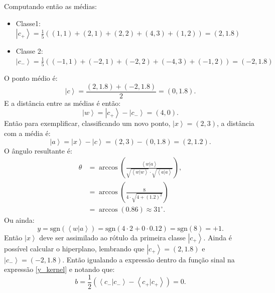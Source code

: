  Computando então as médias:
 \begin{itemize} 
 \item   Classe1: $\left|c_{+}\right\rangle =\frac{1}{5}\left(\left(1,1\right)+\left(2,1\right)+\left(2,2\right)+\left(4,3\right)+\left(1,2\right)\right)=\left(2,1.8\right)$
    \item Classe 2: $\left|c_{-}\right\rangle =\frac{1}{5}\left(\left(-1,1\right)+\left(-2,1\right)+\left(-2,2\right)+\left(-4,3\right)+\left(-1,2\right)\right)=\left(-2,1.8\right)$
 \end{itemize}
O ponto médio é: 
\begin{equation}
\left|c\right\rangle =\frac{\left(2,1.8\right)+\left(-2,1.8\right)}{2}=\left(0,1.8\right) .
\end{equation}
E a distância entre as médias é então:
\begin{equation}
\left|w\right\rangle =\left|c_{+}\right\rangle -\left|c_{-}\right\rangle =\left(4,0\right) .
\end{equation}
Então para exemplificar, classificando um novo ponto,  $\left|x\right\rangle =\left(2,3\right)$, a distância com a média é:
\begin{equation}
\left|a\right\rangle =\left|x\right\rangle -\left|c\right\rangle =\left(2,3\right)-\left(0,1.8\right)=\left(2,1.2\right) .
\end{equation}
O ângulo resultante é:
\begin{equation}
\begin{split}
\theta & =\arccos\left(\frac{\left\langle w|a\right\rangle }{\sqrt{\left\langle w|w\right\rangle }\cdot\sqrt{\left\langle a|a\right\rangle }}\right),\\
& = \arccos\left(\frac{8}{4\cdot\sqrt{4+\left(1.2\right)^{2}}}\right)\\
& =\arccos\left(0.86\right)\approx 31^{\circ} .
\end{split}
\end{equation}
Ou ainda:
\begin{equation}
y=\text{sgn}\left(\left\langle w|a\right\rangle \right)=\text{sgn}\left(4\cdot2+0\cdot0.12\right)=\text{sgn}\left(8\right)=+1 .
\end{equation}
Então $\left|x\right\rangle $ deve ser assimilado ao rótulo da primeira classe $\left|c_+\right\rangle $. Ainda é possível calcular o hiperplano, lembrando que  $\left|c_+\right\rangle =\left(2,1.8\right)$ e 
   $\left|c_-\right\rangle =\left(-2,1.8\right)$. Então igualando a expressão dentro da função sinal na expressão \ref{y_kernel} e notando que:
\begin{equation}
b=\frac{1}{2}\left(\left\langle c_{-}|c_{-}\right\rangle -\left\langle c_{+}|c_{+}\right\rangle \right)=0 .
\end{equation}
